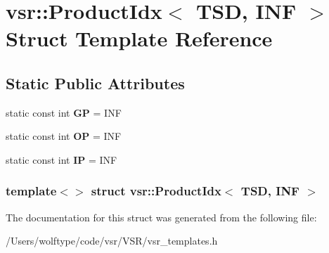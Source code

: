 \hypertarget{structvsr_1_1_product_idx_3_01_t_s_d_00_01_i_n_f_01_4}{\section{vsr\-:\-:Product\-Idx$<$ T\-S\-D, I\-N\-F $>$ Struct Template Reference}
\label{structvsr_1_1_product_idx_3_01_t_s_d_00_01_i_n_f_01_4}
}
\subsection*{Static Public Attributes}
\begin{DoxyCompactItemize}
\item 
\hypertarget{structvsr_1_1_product_idx_3_01_t_s_d_00_01_i_n_f_01_4_a2f922c7eec3264d8da8f78ff94aac4a4}{static const int {\bfseries G\-P} = I\-N\-F}\label{structvsr_1_1_product_idx_3_01_t_s_d_00_01_i_n_f_01_4_a2f922c7eec3264d8da8f78ff94aac4a4}

\item 
\hypertarget{structvsr_1_1_product_idx_3_01_t_s_d_00_01_i_n_f_01_4_a02d500176a20263be6b4c506c4aaa05a}{static const int {\bfseries O\-P} = I\-N\-F}\label{structvsr_1_1_product_idx_3_01_t_s_d_00_01_i_n_f_01_4_a02d500176a20263be6b4c506c4aaa05a}

\item 
\hypertarget{structvsr_1_1_product_idx_3_01_t_s_d_00_01_i_n_f_01_4_affd21411f7c4f0d85e89f721c3d2c710}{static const int {\bfseries I\-P} = I\-N\-F}\label{structvsr_1_1_product_idx_3_01_t_s_d_00_01_i_n_f_01_4_affd21411f7c4f0d85e89f721c3d2c710}

\end{DoxyCompactItemize}
\subsubsection*{template$<$$>$ struct vsr\-::\-Product\-Idx$<$ T\-S\-D, I\-N\-F $>$}



The documentation for this struct was generated from the following file\-:\begin{DoxyCompactItemize}
\item 
/\-Users/wolftype/code/vsr/\-V\-S\-R/vsr\-\_\-templates.\-h\end{DoxyCompactItemize}
